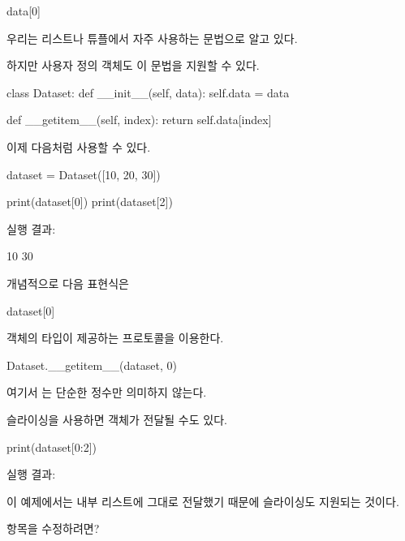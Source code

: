\begin{dhkcode}
data[0]
\end{dhkcode}

우리는 리스트나 튜플에서 자주 사용하는 문법으로 알고 있다.

하지만 사용자 정의 객체도 이 문법을 지원할 수 있다.

\begin{dhkcode}
class Dataset:
    def __init__(self, data):
        self.data = data

    def __getitem__(self, index):
        return self.data[index]
\end{dhkcode}

이제 다음처럼 사용할 수 있다.

\begin{dhkcode}
dataset = Dataset([10, 20, 30])

print(dataset[0])
print(dataset[2])
\end{dhkcode}

실행 결과:

\begin{dhkzsh}
10
30
\end{dhkzsh}

개념적으로 다음 표현식은

\begin{dhkcode}
dataset[0]
\end{dhkcode}

객체의 타입이 제공하는  프로토콜을 이용한다.

\begin{dhkcode}
Dataset.__getitem__(dataset, 0)
\end{dhkcode}

여기서 는 단순한 정수만 의미하지 않는다.

슬라이싱을 사용하면  객체가 전달될 수도 있다.

\begin{dhkcode}
print(dataset[0:2])
\end{dhkcode}

실행 결과:

\begin{dhkzsh}
[10, 20]
\end{dhkzsh}

이 예제에서는 내부 리스트에 그대로 전달했기 때문에 슬라이싱도 지원되는 것이다.

\begin{dhknote}
\begin{dhksmry}[centered]
항목을 수정하려면?
\end{dhksmry}
\end{dhknote}

